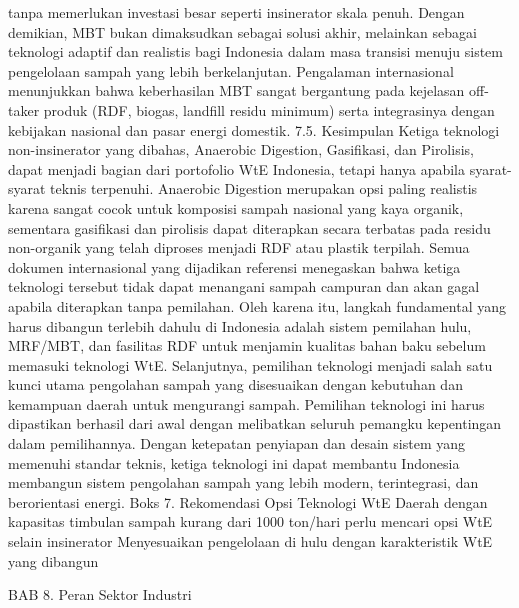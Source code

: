 \documentclass[
  letterpaper,
  DIV=11,
  numbers=noendperiod]{scrreprt}
\begin{document}
tanpa memerlukan investasi besar seperti insinerator skala penuh. Dengan
demikian, MBT bukan dimaksudkan sebagai solusi akhir, melainkan sebagai
teknologi adaptif dan realistis bagi Indonesia dalam masa transisi
menuju sistem pengelolaan sampah yang lebih berkelanjutan. Pengalaman
internasional menunjukkan bahwa keberhasilan MBT sangat bergantung pada
kejelasan off-taker produk (RDF, biogas, landfill residu minimum) serta
integrasinya dengan kebijakan nasional dan pasar energi domestik. 7.5.
Kesimpulan Ketiga teknologi non-insinerator yang dibahas, Anaerobic
Digestion, Gasifikasi, dan Pirolisis, dapat menjadi bagian dari
portofolio WtE Indonesia, tetapi hanya apabila syarat-syarat teknis
terpenuhi. Anaerobic Digestion merupakan opsi paling realistis karena
sangat cocok untuk komposisi sampah nasional yang kaya organik,
sementara gasifikasi dan pirolisis dapat diterapkan secara terbatas pada
residu non-organik yang telah diproses menjadi RDF atau plastik
terpilah. Semua dokumen internasional yang dijadikan referensi
menegaskan bahwa ketiga teknologi tersebut tidak dapat menangani sampah
campuran dan akan gagal apabila diterapkan tanpa pemilahan. Oleh karena
itu, langkah fundamental yang harus dibangun terlebih dahulu di
Indonesia adalah sistem pemilahan hulu, MRF/MBT, dan fasilitas RDF untuk
menjamin kualitas bahan baku sebelum memasuki teknologi WtE.
Selanjutnya, pemilihan teknologi menjadi salah satu kunci utama
pengolahan sampah yang disesuaikan dengan kebutuhan dan kemampuan daerah
untuk mengurangi sampah. Pemilihan teknologi ini harus dipastikan
berhasil dari awal dengan melibatkan seluruh pemangku kepentingan dalam
pemilihannya. Dengan ketepatan penyiapan dan desain sistem yang memenuhi
standar teknis, ketiga teknologi ini dapat membantu Indonesia membangun
sistem pengolahan sampah yang lebih modern, terintegrasi, dan
berorientasi energi. Boks 7. Rekomendasi Opsi Teknologi WtE Daerah
dengan kapasitas timbulan sampah kurang dari 1000 ton/hari perlu mencari
opsi WtE selain insinerator Menyesuaikan pengelolaan di hulu dengan
karakteristik WtE yang dibangun

BAB 8. Peran Sektor Industri
\end{document}
